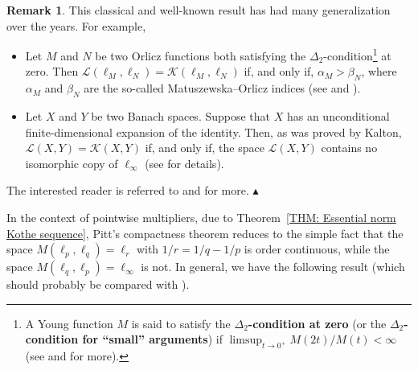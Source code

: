\documentclass[11pt]{amsart}
\theoremstyle{definition}
\theoremstyle{definition}
\theoremstyle{definition}
\theoremstyle{definition}
\theoremstyle{definition}
\theoremstyle{definition}
\newtheorem{remark}[theorem]{Remark}
\theoremstyle{definition}
\theoremstyle{definition}
\numberwithin{equation}{section}
\numberwithin{equation}{section}
\numberwithin{equation}{section}
\theoremstyle{definition}
\theoremstyle{definition}
\theoremstyle{definition}
\theoremstyle{definition}
\theoremstyle{definition}
\theoremstyle{definition}
\newcommand\xqed[1]{%
	\leavevmode\unskip\penalty9999 \hbox{}\nobreak\hfill
	\quad\hbox{#1}}
\newcommand\demo{\xqed{{\Large $\blacktriangle$}}}
\begin{document}
\begin{remark}
	This classical and well-known result has had many generalization over the years. For example,
	\begin{itemize}
		\item[$\bullet$] Let $M$ and $N$ be two Orlicz functions both satisfying the $\Delta_2$-condition\footnote{A Young function $M$ is said to satisfy
			the {\bf $\Delta_2$-condition at zero} (or the {\bf $\Delta_2$-condition for \enquote{small} arguments}) if $\limsup_{t \rightarrow 0^{+}} M(2t)/M(t) < \infty$
			(see \cite[pp.~138--139]{LT77} and \cite[pp.~16--22]{Mal83} for more).} at zero.
		Then ${\mathscr L}(\ell_M,\ell_N) = {\mathscr K}(\ell_M,\ell_N)$ if, and only if, $\alpha_M > \beta_N$,
		where $\alpha_M$ and $\beta_N$ are the so-called Matuszewska--Orlicz indices (see \cite[p.~149]{LT77} and \cite[Chapter~11]{Ma89}).
		\item[$\bullet$] Let $X$ and $Y$ be two Banach spaces. Suppose that $X$ has an unconditional finite-dimensional expansion of the identity.
		Then, as was proved by Kalton, ${\mathscr L}(X,Y) = {\mathscr K}(X,Y)$ if, and only if, the space ${\mathscr L}(X,Y)$ contains no isomorphic copy of $\ell_{\infty}$
		(see \cite[Theorem~6]{Kal74} for details).
	\end{itemize}
	The interested reader is referred to \cite{DLMR00} and \cite{LM02} for more.
	\demo
\end{remark}

In the context of pointwise multipliers, due to Theorem~\ref{THM: Essential norm Kothe sequence}, Pitt's compactness theorem
reduces to the simple fact that the space $M(\ell_p,\ell_q) = \ell_r$ with $1/r = 1/q - 1/p$ is order continuous, while the space
$M(\ell_q,\ell_p) = \ell_{\infty}$ is not.
In general, we have the following result (which should probably be compared with \cite[Proposition~3.1]{Cro69}).
	
\end{document}
